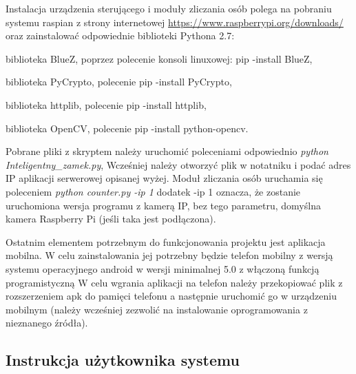 Instalacja urządzenia sterującego i moduły zliczania osób polega na pobraniu systemu raspian z strony internetowej \href{https://www.raspberrypi.org/downloads/}{https://www.raspberrypi.org/downloads/} oraz zainstalować odpowiednie biblioteki Pythona 2.7:
\begin{itemize*}
	\item biblioteka BlueZ, poprzez polecenie konsoli linuxowej: pip -install BlueZ,
	\item biblioteka PyCrypto, polecenie pip -install PyCrypto,
	\item biblioteka httplib, polecenie pip -install httplib,
	\item biblioteka OpenCV, polecenie pip -install python-opencv.
\end{itemize*}

Pobrane pliki z skryptem należy uruchomić poleceniami odpowiednio \textit{python Inteligentny\_zamek.py}, Wcześniej należy otworzyć plik w notatniku i podać adres IP aplikacji serwerowej opisanej wyżej. Moduł zliczania osób uruchamia się poleceniem \textit{python counter.py -ip 1} dodatek -ip 1 oznacza, że zostanie uruchomiona wersja programu z kamerą IP, bez tego parametru, domyślna kamera Raspberry Pi (jeśli taka jest podłączona).

Ostatnim elementem potrzebnym do funkcjonowania projektu jest aplikacja mobilna. W celu zainstalowania jej potrzebny będzie telefon mobilny z wersją systemu operacyjnego android w wersji minimalnej 5.0 z włączoną funkcją programistyczną  W celu wgrania aplikacji na telefon należy przekopiować plik z rozszerzeniem apk do pamięci telefonu a następnie uruchomić go w urządzeniu mobilnym (należy wcześniej zezwolić na instalowanie oprogramowania z nieznanego źródła).
 \newpage
\subsection*{Instrukcja użytkownika systemu \NazwaSys}

